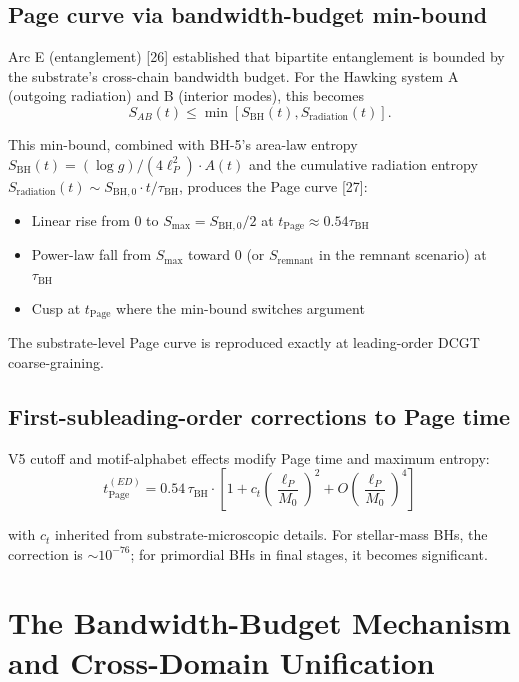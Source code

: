 \documentclass[11pt,a4paper]{article}
\begin{document}
\subsection{Page curve via bandwidth-budget min-bound}

Arc E (entanglement) [26] established that bipartite entanglement is bounded by the substrate's cross-chain bandwidth budget. For the Hawking system A (outgoing radiation) and B (interior modes), this becomes
\[
S_{AB}(t) \leq \min\left[S_{\mathrm{BH}}(t), S_{\mathrm{radiation}}(t)\right].
\]

This min-bound, combined with BH-5's area-law entropy $S_{\mathrm{BH}}(t) = (\log g)/(4\ell_P^2) \cdot A(t)$ and the cumulative radiation entropy $S_{\mathrm{radiation}}(t) \sim S_{\mathrm{BH,0}}\cdot t/\tau_{\mathrm{BH}}$, produces the Page curve [27]:

\begin{itemize}[noitemsep]
  \item Linear rise from 0 to $S_{\mathrm{max}} = S_{\mathrm{BH,0}}/2$ at $t_{\mathrm{Page}} \approx 0.54 \tau_{\mathrm{BH}}$
  \item Power-law fall from $S_{\mathrm{max}}$ toward 0 (or $S_{\mathrm{remnant}}$ in the remnant scenario) at $\tau_{\mathrm{BH}}$
  \item Cusp at $t_{\mathrm{Page}}$ where the min-bound switches argument
\end{itemize}

The substrate-level Page curve is reproduced exactly at leading-order DCGT coarse-graining.

\subsection{First-subleading-order corrections to Page time}

V5 cutoff and motif-alphabet effects modify Page time and maximum entropy:
\[
t_{\mathrm{Page}}^{(ED)} = 0.54\, \tau_{\mathrm{BH}} \cdot \left[1 + c_t \left(\frac{\ell_P}{M_0}\right)^2 + O\left(\frac{\ell_P}{M_0}\right)^4\right]
\]

with $c_t$ inherited from substrate-microscopic details. For stellar-mass BHs, the correction is $\sim 10^{-76}$; for primordial BHs in final stages, it becomes significant.

\section{The Bandwidth-Budget Mechanism and Cross-Domain Unification}
\end{document}
